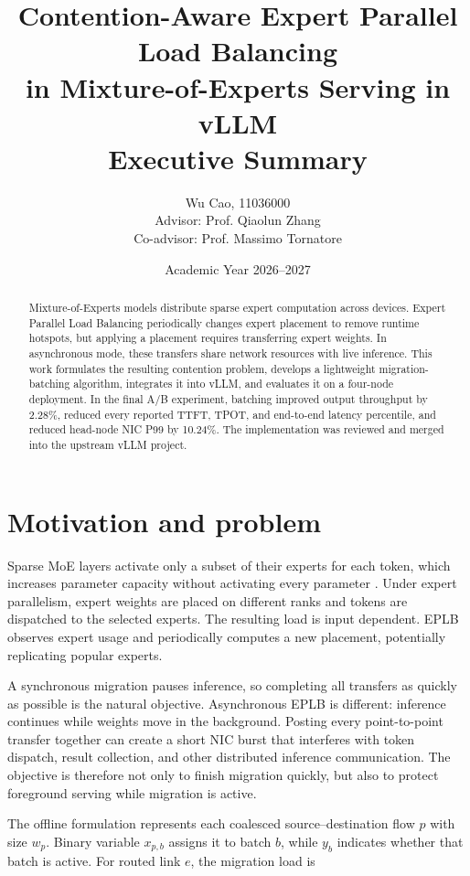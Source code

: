 \documentclass[10pt,a4paper]{article}
\title{\textbf{Contention-Aware Expert Parallel Load Balancing\\
in Mixture-of-Experts Serving in vLLM}\\[2mm]
\large Executive Summary}
\author{Wu Cao, 11036000\\
Advisor: Prof. Qiaolun Zhang\\
Co-advisor: Prof. Massimo Tornatore}
\date{Academic Year 2026--2027}
\begin{document}
\maketitle

\begin{abstract}
Mixture-of-Experts models distribute sparse expert computation across devices.
Expert Parallel Load Balancing periodically changes expert placement to remove
runtime hotspots, but applying a placement requires transferring expert weights.
In asynchronous mode, these transfers share network resources with live
inference. This work formulates the resulting contention problem, develops a
lightweight migration-batching algorithm, integrates it into vLLM, and evaluates
it on a four-node deployment. In the final A/B experiment, batching improved
output throughput by 2.28\%, reduced every reported TTFT, TPOT, and end-to-end
latency percentile, and reduced head-node NIC P99 by 10.24\%. The implementation
was reviewed and merged into the upstream vLLM project.
\end{abstract}

\section{Motivation and problem}

Sparse MoE layers activate only a subset of their experts for each token, which
increases parameter capacity without activating every parameter
\cite{shazeer2017moe,fedus2021switch}. Under expert parallelism, expert weights
are placed on different ranks and tokens are dispatched to the selected experts.
The resulting load is input dependent. EPLB observes expert usage and periodically
computes a new placement, potentially replicating popular experts.

A synchronous migration pauses inference, so completing all transfers as quickly
as possible is the natural objective. Asynchronous EPLB is different: inference
continues while weights move in the background. Posting every point-to-point
transfer together can create a short NIC burst that interferes with token
dispatch, result collection, and other distributed inference communication.
The objective is therefore not only to finish migration quickly, but also to
protect foreground serving while migration is active.

The offline formulation represents each coalesced source--destination flow $p$
with size $w_p$. Binary variable $x_{p,b}$ assigns it to batch $b$, while $y_b$
indicates whether that batch is active. For routed link $e$, the migration load is
\end{document}
